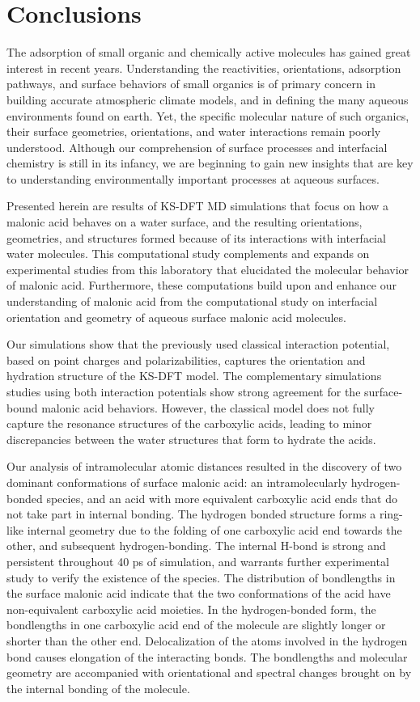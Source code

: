 \section {Conclusions}

The adsorption of small organic and chemically active molecules has gained great interest in recent years. Understanding the reactivities, orientations, adsorption pathways, and surface behaviors of small organics is of primary concern in building accurate atmospheric climate models, and in defining the many aqueous environments found on earth. Yet, the specific molecular nature of such organics, their surface geometries, orientations, and water interactions remain poorly understood. Although our comprehension of surface processes and interfacial chemistry is still in its infancy, we are beginning to gain new insights that are key to understanding environmentally important processes at aqueous surfaces.

Presented herein are results of KS-DFT MD simulations that focus on how a malonic acid behaves on a water surface, and the resulting orientations, geometries, and structures formed because of its interactions with interfacial water molecules. This computational study complements and expands on experimental studies from this laboratory that elucidated the molecular behavior of malonic acid.\cite{Blower2012} Furthermore, these computations build upon and enhance our understanding of malonic acid from the computational study on interfacial orientation and geometry of aqueous surface malonic acid molecules.

Our simulations show that the previously used classical interaction potential, based on point charges and polarizabilities, captures the orientation and hydration structure of the KS-DFT model. The complementary simulations studies using both interaction potentials show strong agreement for the surface-bound malonic acid behaviors. However, the classical model does not fully capture the resonance structures of the carboxylic acids, leading to minor discrepancies between the water structures that form to hydrate the acids.

Our analysis of intramolecular atomic distances resulted in the discovery of two dominant conformations of surface malonic acid: an intramolecularly hydrogen-bonded species, and an acid with more equivalent carboxylic acid ends that do not take part in internal bonding. The hydrogen bonded structure forms a ring-like internal geometry due to the folding of one carboxylic acid end towards the other, and subsequent hydrogen-bonding. The internal H-bond is strong and persistent throughout 40 ps of simulation, and warrants further experimental study to verify the existence of the species. The distribution of bondlengths in the surface malonic acid indicate that the two conformations of the acid have non-equivalent carboxylic acid moieties. In the hydrogen-bonded form, the bondlengths in one carboxylic acid end of the molecule are slightly longer or shorter than the other end. Delocalization of the atoms involved in the hydrogen bond causes elongation of the interacting bonds. The bondlengths and molecular geometry are accompanied with orientational and spectral changes brought on by the internal bonding of the molecule.

